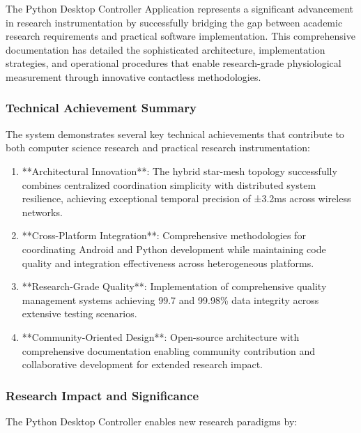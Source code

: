 \documentclass[12pt,a4paper]{article}
\begin{document}
The Python Desktop Controller Application represents a significant advancement in research instrumentation by
successfully bridging the gap between academic research requirements and practical software implementation. This
comprehensive documentation has detailed the sophisticated architecture, implementation strategies, and operational
procedures that enable research-grade physiological measurement through innovative contactless methodologies.

\subsubsection{Technical Achievement Summary}

The system demonstrates several key technical achievements that contribute to both computer science research and
practical research instrumentation:

\begin{enumerate}
\item **Architectural Innovation**: The hybrid star-mesh topology successfully combines centralized coordination simplicity
   with distributed system resilience, achieving exceptional temporal precision of ±3.2ms across wireless networks.

\item **Cross-Platform Integration**: Comprehensive methodologies for coordinating Android and Python development while
   maintaining code quality and integration effectiveness across heterogeneous platforms.

\item **Research-Grade Quality**: Implementation of comprehensive quality management systems achieving 99.7%
   and 99.98\% data integrity across extensive testing scenarios.

\item **Community-Oriented Design**: Open-source architecture with comprehensive documentation enabling community
   contribution and collaborative development for extended research impact.

\end{enumerate}
\subsubsection{Research Impact and Significance}

The Python Desktop Controller enables new research paradigms by:
\end{document}
